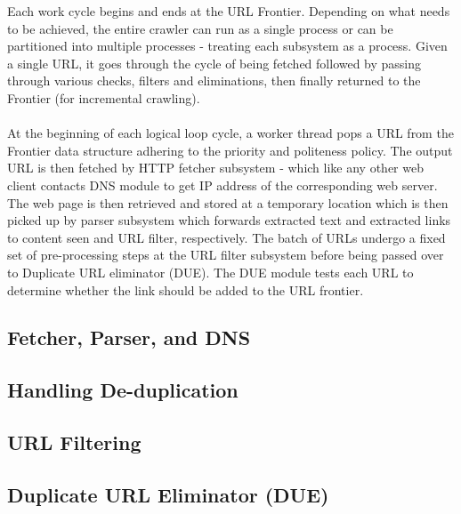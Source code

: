 \noindent
Each work cycle begins and ends at the URL Frontier. Depending on what needs to be
achieved, the entire crawler can run as a single process or can be partitioned into multiple processes - treating each subsystem as a process. Given a single URL, it
goes through the cycle of being fetched followed by passing through various checks,
filters and eliminations, then finally returned to the Frontier (for incremental crawling).
\\
\\
At the beginning of each logical loop cycle, a worker thread pops a URL from the Frontier data structure adhering to the priority and politeness policy. The output URL is then fetched by HTTP fetcher subsystem - which like any other web client contacts DNS module to get IP address of the corresponding web server. The web page is then retrieved and stored at a temporary location which is then picked up by parser subsystem which forwards extracted text and extracted links to content seen and URL filter, respectively. The batch of URLs undergo a fixed set of pre-processing steps at the URL filter subsystem before being passed over to Duplicate URL eliminator (DUE). The DUE module tests each URL to determine whether the link should be added to the
URL frontier.


\subsection{Fetcher, Parser, and DNS}
\subsection{Handling De-duplication}
\subsection{URL Filtering}
\subsection{Duplicate URL Eliminator (DUE)}

\pagebreak


